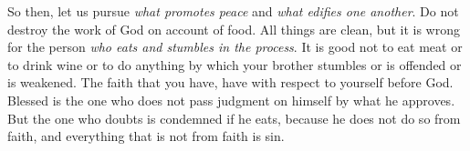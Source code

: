 \begin{biblechapter}
\verse So then, let us pursue \textit{what promotes peace} and \textit{what edifies one another}.
\verse Do not destroy the work of God on account of food. All things are clean, but it is wrong for the person \textit{who eats and stumbles in the process}.
\verse It is good not to eat meat or to drink wine or to do anything by which your brother stumbles or is offended or is weakened.
\verse The faith that you have, have with respect to yourself before God. Blessed is the one who does not pass judgment on himself by what he approves.
\verse But the one who doubts is condemned if he eats, because he does not do so from faith, and everything that is not from faith is sin.
\end{biblechapter}

